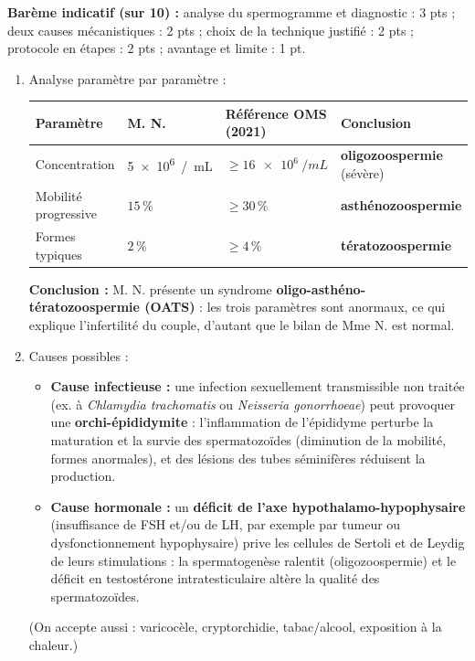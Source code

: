 \documentclass[11pt]{article}
\begin{document}
\begin{corrige}
\textbf{Barème indicatif (sur 10) :} analyse du spermogramme et diagnostic : 3 pts ; deux causes mécanistiques : 2 pts ; choix de la technique justifié : 2 pts ; protocole en étapes : 2 pts ; avantage et limite : 1 pt.

\begin{enumerate}
\item Analyse paramètre par paramètre :
\begin{center}
\begin{tabularx}{\linewidth}{|l|X|X|X|}
\hline
\rowcolor{popblueL} \textbf{Paramètre} & \textbf{M. N.} & \textbf{Référence OMS (2021)} & \textbf{Conclusion} \\
\hline
Concentration & \SI{5e6}{/mL} & $\geq \SI{16e6}{/mL}$ & \textbf{oligozoospermie} (sévère) \\
\hline
Mobilité progressive & $15\,\%$ & $\geq 30\,\%$ & \textbf{asthénozoospermie} \\
\hline
Formes typiques & $2\,\%$ & $\geq 4\,\%$ & \textbf{tératozoospermie} \\
\hline
\end{tabularx}
\end{center}
\textbf{Conclusion :} M. N. présente un syndrome \textbf{oligo-asthéno-tératozoospermie (OATS)} : les trois paramètres sont anormaux, ce qui explique l'infertilité du couple, d'autant que le bilan de Mme N. est normal.
\item Causes possibles :
\begin{itemize}
\item \textbf{Cause infectieuse :} une infection sexuellement transmissible non traitée (ex. à \emph{Chlamydia trachomatis} ou \emph{Neisseria gonorrhoeae}) peut provoquer une \textbf{orchi-épididymite} : l'inflammation de l'épididyme perturbe la maturation et la survie des spermatozoïdes (diminution de la mobilité, formes anormales), et des lésions des tubes séminifères réduisent la production.
\item \textbf{Cause hormonale :} un \textbf{déficit de l'axe hypothalamo-hypophysaire} (insuffisance de FSH et/ou de LH, par exemple par tumeur ou dysfonctionnement hypophysaire) prive les cellules de Sertoli et de Leydig de leurs stimulations : la spermatogenèse ralentit (oligozoospermie) et le déficit en testostérone intratesticulaire altère la qualité des spermatozoïdes.
\end{itemize}
(On accepte aussi : varicocèle, cryptorchidie, tabac/alcool, exposition à la chaleur.)

\end{enumerate}
\end{corrige}
\end{document}
